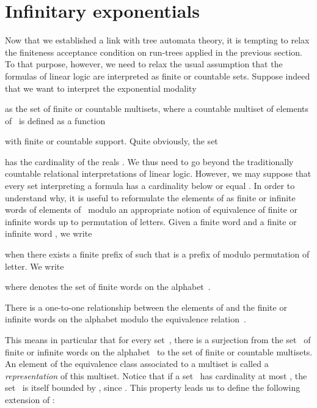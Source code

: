 \documentclass[runningheads,a4paper]{llncs}
\begin{document}
\section{Infinitary exponentials}
\label{section/infinitary-rel}
Now that we established a link with tree automata theory, it is tempting to relax the finiteness acceptance condition
on run-trees applied in the previous section.
To that purpose, however, we need to relax the usual assumption that the formulas of linear logic
are interpreted as finite or countable sets.
Suppose indeed that we want to interpret the exponential modality

as the set of finite or countable multisets, where a countable multiset
of elements of~ is defined as a function

with finite or countable support.
Quite obviously, the set

has the cardinality of the reals .
We thus need to go beyond the traditionally countable relational interpretations of linear logic.
However, we may suppose that every set  interpreting a formula has a cardinality 
below or equal .
In order to understand why, it is useful to reformulate the elements of 
as finite or infinite words of elements of~ modulo an appropriate notion of equivalence
of finite or infinite words up to permutation of letters.
Given a finite word  and a finite or infinite word , we write

when there exists a finite prefix  of  such that  is a prefix of  modulo permutation of letter.
We write

where  denotes the set of finite words on the alphabet~.
\begin{proposition}
There is a one-to-one relationship between the elements of 
and the finite or infinite words on the alphabet  modulo the equivalence relation~.
\end{proposition}
This means in particular that for every set~,
there is a surjection from the set~
of finite or infinite words on the alphabet~ to the set 
of finite or countable multisets.
An element of the equivalence class associated to a multiset is called a \emph{representation} of this multiset.
Notice that if a set~ has cardinality at most , the set~
is itself bounded by , since .
This property leads us to define the following extension of :
\end{document}
